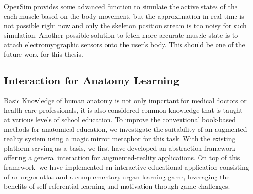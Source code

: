OpenSim provides some advanced function to simulate the active states of the each muscle based on the body movement, but the approximation in real time is not possible right now and only the skeleton position stream is too noisy for such simulation. Another possible solution to fetch more accurate muscle state is to attach electromyographic sensors onto the user's body. This should be one of the future work for this thesis. 

\subsection{Interaction for Anatomy Learning} \label{sec:3-IMR:anatomyLearning}
Basic Knowledge of human anatomy is not only important for medical doctors or health-care professionals, it is also considered common knowledge that is taught at various levels of school education. To improve the conventional book-based methods for anatomical education, we investigate the suitability of an augmented reality system using a magic mirror metaphor for this task.
With the existing platform serving as a basis, we first have developed an abstraction framework offering a general interaction for augmented-reality applications. On top of this framework, we have implemented an interactive educational application consisting of an organ atlas and a complementary organ learning game, leveraging the benefits of self-referential learning and motivation through game challenges.
